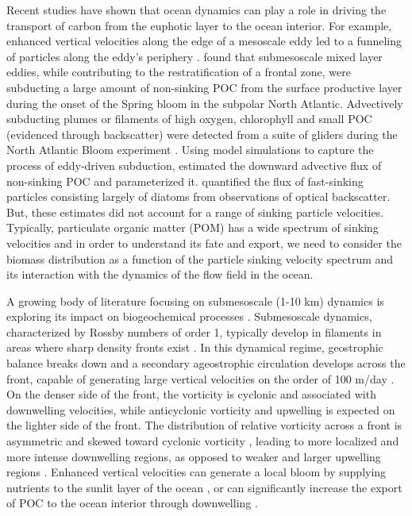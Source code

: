 \documentclass[article,linenumbers]{agujournal2018}
\begin{document}
	Recent studies have shown that ocean dynamics can play a role in driving the transport of carbon from the euphotic layer to the ocean interior.  For example, enhanced vertical velocities along the edge of a mesoscale eddy led to a funneling of particles along the eddy's periphery \citep{vanHaren_2006, Waite_2016}.  
	\cite{Omand_2015}  found that submesoscale mixed layer eddies, while contributing to the restratification of a frontal zone, were subducting a large amount of non-sinking POC from the surface productive layer during the onset of the Spring bloom in the subpolar North Atlantic. Advectively subducting plumes or filaments of high oxygen, chlorophyll and small POC (evidenced through backscatter) were detected from a suite of gliders during the North Atlantic Bloom experiment \citep{Alkire_2012}. Using model simulations to capture the process of eddy-driven subduction, \cite{Omand_2015} estimated the downward advective flux of non-sinking POC and parameterized it. \cite{Briggs_2011} quantified the flux of fast-sinking particles consisting largely of diatoms from observations of optical backscatter. But, these estimates did not account for a range of sinking particle velocities.  Typically, particulate organic matter (POM) has a wide spectrum of sinking velocities and in order to understand its fate and export, we need to consider the biomass distribution as a function of the particle sinking velocity spectrum and its interaction with the dynamics of the flow field in the ocean.
	
	A growing body of literature focusing on submesoscale (1-10 km) dynamics is exploring its impact on biogeochemical processes \citep{Levy_2012,Mahadevan_2016}. Submesoscale dynamics, characterized by Rossby numbers of order 1, typically develop in filaments in areas where sharp density fronts exist \citep{Thomas_2013b,Klein_2009,McWilliams_2016}. In this dynamical regime, geostrophic balance breaks down and a secondary ageostrophic circulation develops across the front, capable of generating large vertical velocities on the order of 100 m/day \citep{FoxKemper_2008,Mahadevan_2016}. On the denser side of the front, the vorticity is cyclonic and associated with downwelling velocities, while anticyclonic vorticity and upwelling is expected on the lighter side of the front. The distribution of relative vorticity across a front is asymmetric and skewed toward cyclonic vorticity \citep{Rudnick_2001}, leading to more localized and more intense downwelling regions, as opposed to weaker and larger upwelling regions \citep{Mahadevan_2006}. Enhanced vertical velocities can generate a local bloom by supplying nutrients to the sunlit layer of the ocean \citep{Mahadevan_2000,Levy_2001}, or can significantly increase the export of POC to the ocean interior through downwelling \citep{Levy_2012, Gruber_2011,Estapa_2015,Omand_2015}.
	
\end{document}
